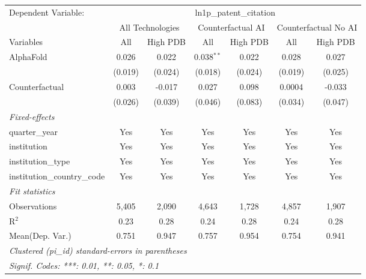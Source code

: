 \begingroup
\centering
\begin{tabular}{lcccccc}
   \tabularnewline \midrule \midrule
   Dependent Variable: & \multicolumn{6}{c}{ln1p\_patent\_citation}\\
 & \multicolumn{2}{c}{All Technologies} & \multicolumn{2}{c}{Counterfactual AI} & \multicolumn{2}{c}{Counterfactual No AI} \\
\cmidrule(lr){1-1}\cmidrule(lr){2-3} \cmidrule(lr){4-5} \cmidrule(lr){6-7}
Variables & \multicolumn{1}{c}{All} & \multicolumn{1}{c}{High PDB} & \multicolumn{1}{c}{All} & \multicolumn{1}{c}{High PDB} & \multicolumn{1}{c}{All} & \multicolumn{1}{c}{High PDB} \\
\cmidrule(lr){1-1}\cmidrule(lr){2-2} \cmidrule(lr){3-3} \cmidrule(lr){4-4} \cmidrule(lr){5-5} \cmidrule(lr){6-6} \cmidrule(lr){7-7}
   AlphaFold                    & 0.026   & 0.022   & 0.038$^{**}$ & 0.022   & 0.028   & 0.027\\   
                                & (0.019) & (0.024) & (0.018)      & (0.024) & (0.019) & (0.025)\\   
   Counterfactual               & 0.003   & -0.017  & 0.027        & 0.098   & 0.0004  & -0.033\\   
                                & (0.026) & (0.039) & (0.046)      & (0.083) & (0.034) & (0.047)\\   
   \midrule
   \emph{Fixed-effects}\\
   quarter\_year                & Yes     & Yes     & Yes          & Yes     & Yes     & Yes\\  
   institution                  & Yes     & Yes     & Yes          & Yes     & Yes     & Yes\\  
   institution\_type            & Yes     & Yes     & Yes          & Yes     & Yes     & Yes\\  
   institution\_country\_code   & Yes     & Yes     & Yes          & Yes     & Yes     & Yes\\  
   \midrule
   \emph{Fit statistics}\\
   Observations                 & 5,405   & 2,090   & 4,643        & 1,728   & 4,857   & 1,907\\  
   R$^2$                        & 0.23    & 0.28    & 0.24         & 0.28    & 0.24    & 0.28\\  
Mean(Dep. Var.) & 0.751 & 0.947 & 0.757 & 0.954 & 0.754 & 0.941 \\
   \midrule \midrule
   \multicolumn{7}{l}{\emph{Clustered (pi\_id) standard-errors in parentheses}}\\
   \multicolumn{7}{l}{\emph{Signif. Codes: ***: 0.01, **: 0.05, *: 0.1}}\\
\end{tabular}
\par\endgroup

